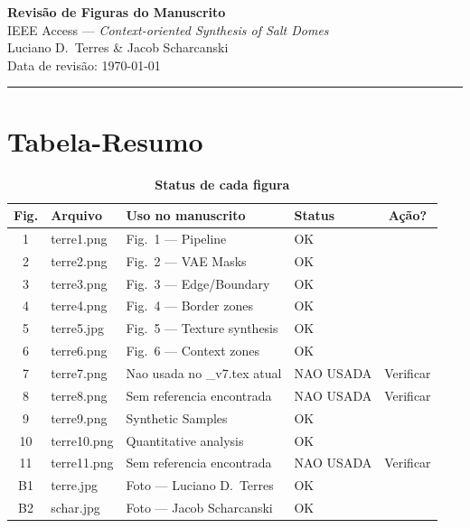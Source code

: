 \documentclass[a4paper,12pt]{article}
\begin{document}
\begin{center}
  {\LARGE\bfseries Revisão de Figuras do Manuscrito}\\[6pt]
  {\large IEEE Access — \textit{Context-oriented Synthesis of Salt Domes}}\\[4pt]
  {\large Luciano D.\ Terres \& Jacob Scharcanski}\\[2pt]
  {\normalsize Data de revisão: \today}
\end{center}
\vspace{0.5cm}
\hrule
\vspace{0.5cm}

\section*{Tabela-Resumo}

\begin{table}[h!]
\centering
\caption*{\textbf{Status de cada figura}}
\renewcommand{\arraystretch}{1.4}
\begin{tabular}{clllc}
\toprule
\textbf{Fig.} & \textbf{Arquivo} & \textbf{Uso no manuscrito} & \textbf{Status} & \textbf{Ação?} \\
\midrule
\rowcolor{ok}      1  & terre1.png  & Fig.\ 1 --- Pipeline            & OK         & \\
\rowcolor{ok}      2  & terre2.png  & Fig.\ 2 --- VAE Masks           & OK         & \\
\rowcolor{ok}      3  & terre3.png  & Fig.\ 3 --- Edge/Boundary       & OK         & \\
\rowcolor{ok}      4  & terre4.png  & Fig.\ 4 --- Border zones        & OK         & \\
\rowcolor{ok}      5  & terre5.jpg  & Fig.\ 5 --- Texture synthesis   & OK         & \\
\rowcolor{ok}      6  & terre6.png  & Fig.\ 6 --- Context zones       & OK         & \\
\rowcolor{unused}  7  & terre7.png  & Nao usada no \_v7.tex atual     & NAO USADA  & Verificar \\
\rowcolor{unused}  8  & terre8.png  & Sem referencia encontrada       & NAO USADA  & Verificar \\
\rowcolor{ok}      9  & terre9.png  & Synthetic Samples               & OK         & \\
\rowcolor{ok}     10  & terre10.png & Quantitative analysis           & OK         & \\
\rowcolor{unused} 11  & terre11.png & Sem referencia encontrada       & NAO USADA  & Verificar \\
\rowcolor{ok}     B1  & terre.jpg   & Foto --- Luciano D.\ Terres     & OK         & \\
\rowcolor{ok}     B2  & schar.jpg   & Foto --- Jacob Scharcanski      & OK         & \\
\bottomrule
\end{tabular}
\end{table}
\end{document}
